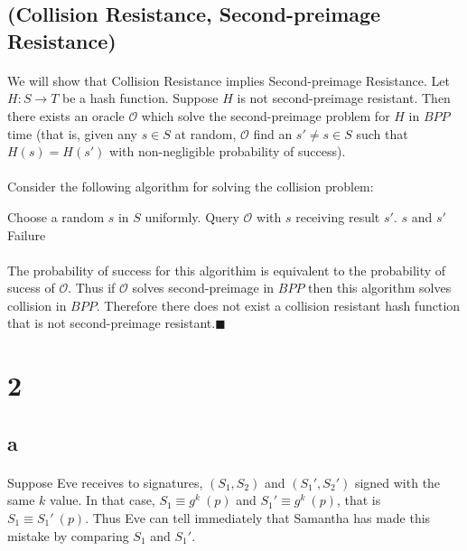 \documentclass[letterpaper,12pt,oneside,onecolumn]{report}
\begin{document}
\subsection*{(Collision Resistance, Second-preimage Resistance)}
\paragraph{}
We will show that Collision Resistance implies Second-preimage Resistance. Let $H : S \rightarrow T$ be a hash function. Suppose $H$ is not second-preimage resistant. Then there exists an oracle $\mathcal{O}$ which solve the second-preimage problem for $H$ in $BPP$ time (that is, given any $s \in S$ at random, $\mathcal{O}$ find an $s' \neq s \in S$ such that $H(s) = H(s')$ with non-negligible probability of success).
\paragraph{}
Consider the following algorithm for solving the collision problem:
\begin{algorithm}
\begin{algorithmic}[1]
\Procedure{}{}
\State Choose a random $s$ in $S$ uniformly.
\State Query $\mathcal{O}$ with $s$ receiving result $s'$.
\State \Return $s$ and $s'$
\EndIf
\State \Return Failure
\EndProcedure
\end{algorithmic}
\end{algorithm}
\paragraph{}
The probability of success for this algorithim is equivalent to the probability of sucess of $\mathcal{O}$. Thus if $\mathcal{O}$ solves  second-preimage in $BPP$ then this algorithm solves collision in $BPP$. Therefore there does not exist a collision resistant hash function that is not second-preimage resistant.$\blacksquare$
\section*{2}
\subsection*{a}
\paragraph{}
Suppose Eve receives to signatures, $(S_1, S_2)$ and $(S_1', S_2')$ signed with the same $k$ value. In that case, $S_1 \equiv g^k\ (p)$ and $S_1' \equiv g^k\ (p)$, that is $S_1 \equiv S_1'\ (p)$. Thus Eve can tell immediately that Samantha has made this mistake by comparing $S_1$ and $S_1'$.
\end{document}
